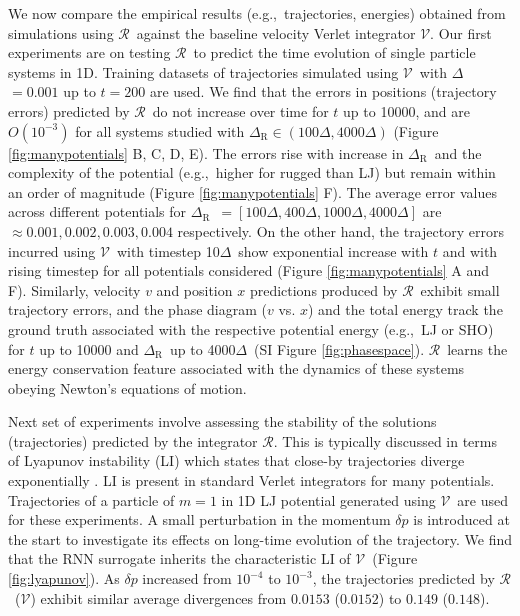 \documentclass[aps,prl,twocolumn,superscriptaddress,tightenlines,longbibliography, reprint]{revtex4-1}
\newcommand{\eg}{e.g.,}
\newcommand{\dt}{$\Delta$}
\newcommand{\dtR}{$\Delta_{\textrm{R}}$}
\newcommand{\R}{$\mathscr{R}$}
\newcommand{\V}{$\mathscr{V}$}
\begin{document}
We now compare the empirical results (\eg\ trajectories, energies) obtained from simulations using \R\ against the baseline velocity Verlet integrator \V. 
Our first experiments are on testing \R\ to predict the time evolution of single particle systems in 1D. Training datasets of trajectories simulated using \V\ with \dt$=0.001$ up to $t=200$ are used.
We find that the errors in positions (trajectory errors) predicted by \R\ do not increase over time for $t$ up to 10000, and are $O( 10^{-3})$ for all systems studied with $\Delta_{\textrm{R}} \in (100\Delta,4000\Delta)$ (Figure \ref{fig:manypotentials} B, C, D, E). The errors rise with increase in \dtR\ and the complexity of the potential (\eg\ higher for rugged than LJ) but remain within an order of magnitude (Figure \ref{fig:manypotentials} F). 
The average error values across different potentials for \dtR\ $= [100\Delta, 400\Delta, 1000\Delta, 4000\Delta]$ are $\approx 0.001, 0.002, 0.003, 0.004$ respectively.
On the other hand, the trajectory errors incurred using \V\ with timestep 10\dt\ show exponential increase with $t$ and with rising timestep for all potentials considered (Figure \ref{fig:manypotentials} A and F). 
Similarly, velocity $v$ and position $x$ predictions produced by \R\ exhibit small trajectory errors, and the phase diagram ($v$ vs. $x$) and the total energy track the ground truth associated with the respective potential energy (\eg\ LJ or SHO) for $t$ up to 10000 and \dtR\ up to 4000\dt\ (SI Figure \ref{fig:phasespace}). \R\ learns the energy conservation feature associated with the dynamics of these systems obeying Newton's equations of motion.

Next set of experiments involve assessing the stability of the solutions (trajectories) predicted by the integrator \R. 
This is typically discussed in terms of Lyapunov instability (LI) which states that close-by trajectories diverge exponentially \cite{posch1988lyapunov, venneri1987simple}. LI is present in standard Verlet integrators for many potentials.
Trajectories of a particle of $m=1$ in 1D LJ potential generated using \V\ are used for these experiments. 
A small perturbation in the momentum $\delta p$ is introduced at the start to investigate its effects on long-time evolution of the trajectory.
We find that the RNN surrogate inherits the characteristic LI of \V\ (Figure \ref{fig:lyapunov}). 
As $\delta p$ increased from $10^{-4}$ to $10^{-3}$, the trajectories predicted by \R\ (\V) exhibit similar average divergences from $0.0153$ ($0.0152$) to $0.149$ ($0.148$). 
\end{document}
